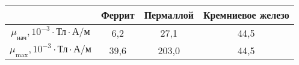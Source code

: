 \begin{tabular}{cccc}
\toprule
& Феррит & Пермаллой & Кремниевое железо \\
\midrule
$\mu_\text{нач}, 10^{-3}\cdot\text{Тл}\cdot\text{А/м}$ & 6,2    & 27,1  & 44,5    \\
$\mu_\text{max}, 10^{-3}\cdot\text{Тл}\cdot\text{А/м}$ & 39,6   & 203,0 & 44,5    \\
\bottomrule
\end{tabular}
